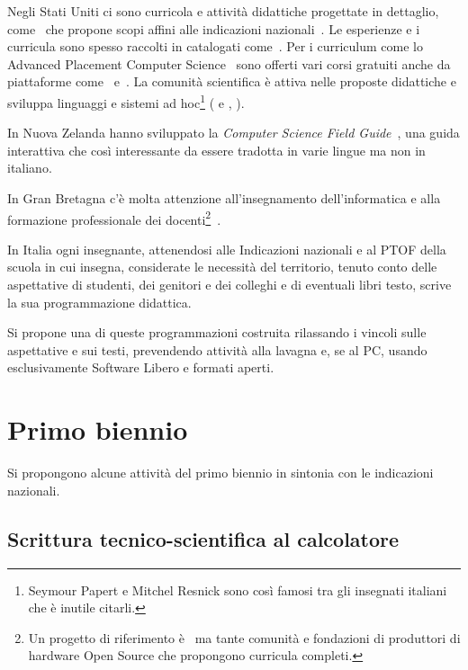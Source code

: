 \documentclass{easychair}
\begin{document}
Negli Stati Uniti ci sono curricola e attività didattiche progettate in
dettaglio, come~\cite{fisler2021evolving} che propone scopi affini
alle indicazioni nazionali~\cite{indicazioniNazionali}.
Le esperienze e i curricula sono spesso raccolti in catalogati come~\cite{cs4all}.
Per i curriculum come lo Advanced Placement Computer Science~\cite{ap-csp}
sono offerti vari corsi gratuiti anche da piattaforme come~\cite{code-org}
e~\cite{khan-academy}.
La comunità scientifica è attiva nelle proposte didattiche e sviluppa linguaggi
e sistemi ad hoc\footnote{%
Seymour Papert e Mitchel Resnick sono così famosi tra gli insegnati italiani che è inutile citarli.} %
(\cite{abelson1996structure} e \cite{abelson2022structure}, \cite{friedman1995little}).

In Nuova Zelanda hanno sviluppato la \textit{Computer Science Field Guide}~\cite{csfg},
una guida interattiva che così interessante da essere tradotta in varie lingue ma non in italiano.

In Gran Bretagna c'è molta attenzione all'insegnamento dell'informatica
e alla formazione professionale dei docenti\footnote{Un progetto di riferimento è~\cite{nc4ce} ma tante comunità e fondazioni
di produttori di hardware Open Source che propongono curricula completi.
}~\cite{fowler2021england}.

In Italia ogni insegnante, attenendosi alle Indicazioni nazionali e al PTOF
della scuola in cui insegna, considerate le necessità del territorio,
tenuto conto delle aspettative di studenti, dei genitori e dei colleghi e
di eventuali libri testo, 
scrive la sua programmazione didattica.

Si propone una di queste programmazioni costruita rilassando
i vincoli sulle aspettative e sui testi, prevendendo attività
alla lavagna e, se al PC, usando esclusivamente
Software Libero e formati aperti.


\section{Primo biennio}
\label{sec:b1}

Si propongono alcune attività del primo biennio in sintonia con le indicazioni nazionali.

\subsection[Scrittura tecnico-scientifica]{Scrittura tecnico-scientifica al calcolatore} 
\end{document}
